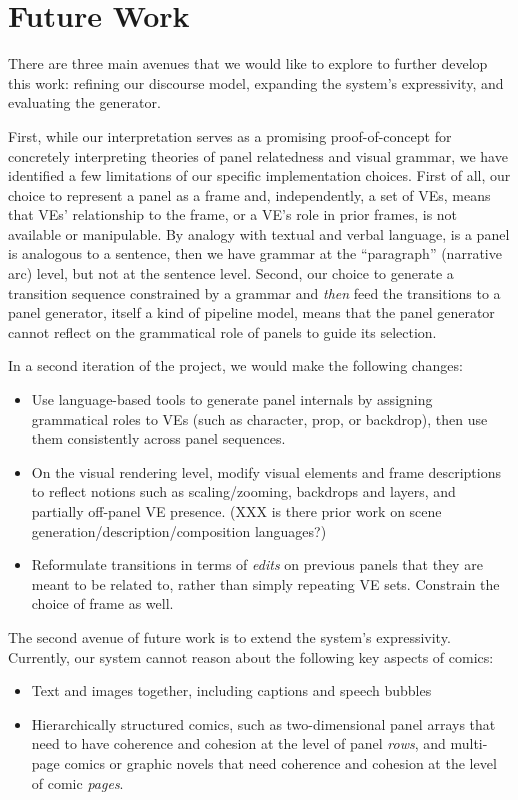 \section{Future Work}

There are three main avenues that we would like to explore to further develop
this work: refining our discourse model, expanding the system's
expressivity, and evaluating the generator.

First, while our interpretation serves as a promising proof-of-concept for
concretely interpreting theories of panel relatedness and visual grammar,
we have identified a few limitations of our specific implementation
choices.  First of all, our choice to represent a panel as a frame and,
independently, a set of VEs, means that VEs' relationship to the frame, or
a VE's role in prior frames, is not available or manipulable.  By analogy
with textual and verbal language, is a panel is analogous to a sentence,
then we have grammar at the ``paragraph'' (narrative arc) level, but not at
the sentence level.  Second, our choice to generate a transition sequence
constrained by a grammar and {\em then} feed the transitions to a panel
generator, itself a kind of pipeline model, means that the panel generator
cannot reflect on the grammatical role of panels to guide its selection.

In a second iteration of the project, we would make the following changes:
\begin{itemize}
\item Use language-based tools to generate panel internals by assigning
grammatical roles to VEs (such as character, prop, or backdrop), then
use them consistently across panel sequences.
\item On the visual rendering level, modify visual elements and frame
descriptions to reflect notions such as scaling/zooming, backdrops and
layers, and partially off-panel VE presence. (XXX is there prior work on scene
generation/description/composition languages?)
\item Reformulate transitions in terms of {\em edits} on previous panels
that they are meant to be related to, rather than simply repeating VE sets.
Constrain the choice of frame as well.
\end{itemize}

The second avenue of future work is to extend the system's expressivity.
Currently, our system cannot reason about the following key aspects of
comics:
\begin{itemize}
\item Text and images together, including captions and speech bubbles
\item Hierarchically structured comics, such as two-dimensional panel
arrays that need to have coherence and cohesion at the level of panel {\em
rows}, and multi-page comics or graphic novels that need coherence and
cohesion at the level of comic {\em pages}.
\end{itemize}


